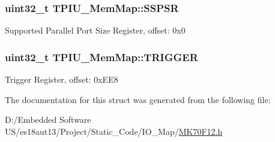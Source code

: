 \subsubsection[{S\+S\+P\+S\+R}]{\setlength{\rightskip}{0pt plus 5cm}uint32\+\_\+t T\+P\+I\+U\+\_\+\+Mem\+Map\+::\+S\+S\+P\+S\+R}\label{struct_t_p_i_u___mem_map_a3570cf26e2ddc1d5700776743b0506e3}
Supported Parallel Port Size Register, offset\+: 0x0 \hypertarget{struct_t_p_i_u___mem_map_a267271b4e2d7ad48cba1614440c741fb}{}
\subsubsection[{T\+R\+I\+G\+G\+E\+R}]{\setlength{\rightskip}{0pt plus 5cm}uint32\+\_\+t T\+P\+I\+U\+\_\+\+Mem\+Map\+::\+T\+R\+I\+G\+G\+E\+R}\label{struct_t_p_i_u___mem_map_a267271b4e2d7ad48cba1614440c741fb}
Trigger Register, offset\+: 0x\+E\+E8 

The documentation for this struct was generated from the following file\+:\begin{DoxyCompactItemize}
\item 
D\+:/\+Embedded Software U\+S/es18aut13/\+Project/\+Static\+\_\+\+Code/\+I\+O\+\_\+\+Map/\hyperlink{_m_k70_f12_8h}{M\+K70\+F12.\+h}\end{DoxyCompactItemize}
